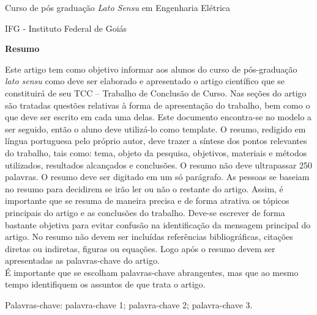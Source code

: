 \documentclass[a4paper, 12pt, oneside] {article}
\begin{document}
\singlespacing %
\justifying %




\begin{center}

    \par {{Curso de pós graduação \textit{Lato Sensu} em Engenharia Elétrica}}
    \par {{IFG - Instituto Federal de Goiás}}
    
\end{center}

\noindent \textbf{Resumo}
\singlespacing

\noindent Este artigo tem como objetivo informar aos alunos do curso de pós-graduação \textit{lato sensu} como deve ser elaborado e apresentado o artigo científico que se constituirá de seu TCC – Trabalho de Conclusão de Curso. Nas seções do artigo são tratadas questões relativas à forma de apresentação do trabalho, bem como o que deve ser escrito em cada uma delas. Este documento encontra-se no modelo a ser seguido, então o aluno deve utilizá-lo como template. O resumo, redigido em língua portuguesa pelo próprio autor, deve trazer a síntese dos pontos relevantes do trabalho, tais como: tema, objeto da pesquisa, objetivos, materiais  e métodos utilizados, resultados alcançados e conclusões. O resumo não deve ultrapassar  250 palavras.  O resumo deve ser digitado em um só parágrafo. As pessoas se baseiam no resumo para decidirem se irão ler ou não o restante do artigo. Assim, é importante que se resuma de maneira precisa e de forma atrativa os tópicos principais do artigo e as conclusões do trabalho. Deve-se escrever de forma bastante objetiva para evitar confusão na identificação da mensagem principal do artigo. No resumo não devem ser incluídas referências bibliográficas, citações diretas ou indiretas, figuras ou equações. Logo após o resumo devem ser apresentadas as palavras-chave do artigo.\cite{ramsey}\\ 
É importante que se escolham palavras-chave abrangentes, mas que ao mesmo tempo identifiquem os assuntos de que trata o artigo.\singlespacing

\noindent  Palavras-chave: palavra-chave 1; palavra-chave 2; palavra-chave 3. \bigskip


\end{document}
